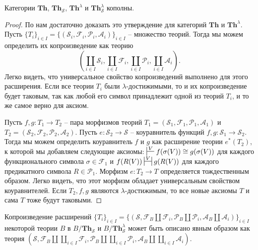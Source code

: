 \documentclass[reqno]{amsart}
\theoremstyle{definition}
\theoremstyle{remark}
\newcommand{\bcat}[1]{\mathbf{#1}}
\newcommand{\Th}{\bcat{Th}}
\begin{document}
\begin{prop}[th-colimits]
Категории $\Th$, $\Th_\mathcal{S}$, $\Th^\lambda$ и $\Th_\mathcal{S}^\lambda$ кополны.
\end{prop}
\begin{proof}
По  нам достаточно доказать это утверждение для категорий $\Th$ и $\Th^\lambda$.
Пусть $\{ T_i \}_{i \in I} = \{ (\mathcal{S}_i,\mathcal{F}_i,\mathcal{P}_i,\mathcal{A}_i) \}_{i \in I}$ -- множество теорий.
Тогда мы можем определить их копроизведение как теорию
\[ (\coprod\limits_{i \in I} \mathcal{S}_i, \coprod\limits_{i \in I} \mathcal{F}_i, \coprod\limits_{i \in I} \mathcal{P}_i, \coprod\limits_{i \in I} \mathcal{A}_i). \]
Легко видеть, что универсальное свойство копроизведений выполнено для этого расширения.
Если все теории $T_i$ были $\lambda$-достижимыми, то и их копроизведение будет таковым, так как любой его символ принадлежит одной из теорий $T_i$, и то же самое верно для аксиом.

Пусть $f,g : T_1 \to T_2$ -- пара морфизмов теорий $T_1 = (\mathcal{S}_1,\mathcal{F}_1,\mathcal{P}_1,\mathcal{A}_1)$ и $T_2 = (\mathcal{S}_2,\mathcal{F}_2,\mathcal{P}_2,\mathcal{A}_2)$.
Пусть $e : \mathcal{S}_2 \to \mathcal{S}$ -- коуравнитель функций $f,g : \mathcal{S}_1 \to \mathcal{S}_2$.
Тогда мы можем определить коуравнитель $f$ и $g$ как расширение теории $e^*(T_2)$, к которой мы добавляем следующие аксиомы:
$\sststile{}{V} f(\sigma(V)) \cong g(\sigma(V))$ для каждого функционального символа $\sigma \in \mathcal{F}_1$
и $f(R(V)) \ssststile{}{V} g(R(V))$ для каждого предикатного символа $R \in \mathcal{P}_1$.
Морфизм $e : T_2 \to T$ определяется тождественным образом.
Легко видеть, что этот морфизм обладает универсальным свойством коуравнителей.
Если $T_2,f,g$ являются $\lambda$-достижимым, то все новые аксиомы $T$ и сама $T$ тоже будут таковыми.
\end{proof}

\begin{remark}
Копроизведение расширений $\{ T_i \}_{i \in I} = \{ (\mathcal{S}, \mathcal{F}_B \amalg \mathcal{F}_i, \mathcal{P}_B \amalg \mathcal{P}_i, \mathcal{A}_B \amalg \mathcal{A}_i) \}_{i \in I}$
некоторой теории $B$ в $B/\Th_\mathcal{S}$ и $B/\Th_\mathcal{S}^\lambda$ может быть описано явным образом как теория
$(\mathcal{S}, \mathcal{F}_B \amalg \coprod\limits_{i \in I} \mathcal{F}_i, \mathcal{P}_B \amalg \coprod\limits_{i \in I} \mathcal{P}_i, \mathcal{A}_B \amalg \coprod\limits_{i \in I} \mathcal{A}_i)$.
\end{remark}
\end{document}
